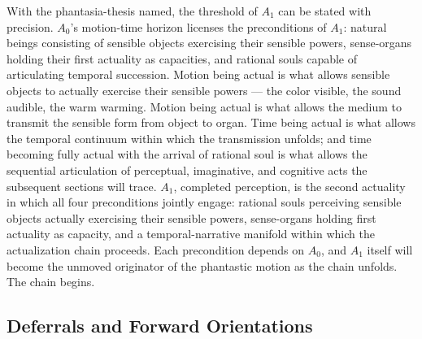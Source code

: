 With the phantasia-thesis named, the threshold of $A_1$ can be stated with precision. $A_0$'s motion-time horizon licenses the preconditions of $A_1$: natural beings consisting of sensible objects exercising their sensible powers, sense-organs holding their first actuality as capacities, and rational souls capable of articulating temporal succession. Motion being actual is what allows sensible objects to actually exercise their sensible powers --- the color visible, the sound audible, the warm warming. Motion being actual is what allows the medium to transmit the sensible form from object to organ. Time being actual is what allows the temporal continuum within which the transmission unfolds; and time becoming fully actual with the arrival of rational soul is what allows the sequential articulation of perceptual, imaginative, and cognitive acts the subsequent sections will trace. $A_1$, completed perception, is the second actuality in which all four preconditions jointly engage: rational souls perceiving sensible objects actually exercising their sensible powers, sense-organs holding first actuality as capacity, and a temporal-narrative manifold within which the actualization chain proceeds. Each precondition depends on $A_0$, and $A_1$ itself will become the unmoved originator of the phantastic motion as the chain unfolds. The chain begins.

\subsection*{Deferrals and Forward Orientations}


